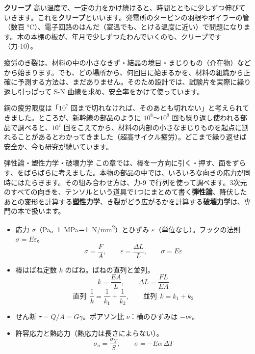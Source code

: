 \noindent\textbf{クリープ}\quad
高い温度で、一定の力をかけ続けると、時間とともに少しずつ伸びていきます。これを\textbf{クリープ}といいます。発電所のタービンの羽根やボイラーの管（数百 \unit{\celsius}）、電子回路のはんだ（室温でも、とける温度に近い）で問題になります。木の本棚の板が、年月で少しずつたわんでいくのも、クリープです（力-10）。

\begin{phmada}
疲労のき裂は、材料の中の小さなきず・結晶の境目・まじりもの（介在物）などから始まります。でも、どの場所から、何回目に始まるかを、材料の組織から正確に予測する方法は、まだありません。そのため設計では、試験片を実際に繰り返し引っぱって S-N 曲線を求め、安全率をかけて使っています。

鋼の疲労限度は「$10^7$ 回まで切れなければ、そのあとも切れない」と考えられてきました。ところが、新幹線の部品のように $10^8$〜$10^9$ 回も繰り返し使われる部品で調べると、$10^7$ 回をこえてから、材料の内部の小さなまじりものを起点に割れることがあるとわかってきました（超高サイクル疲労）。どこまで繰り返せば安全か、今も研究が続いています。
\end{phmada}

\begin{phsaki}{弾性論・塑性力学・破壊力学}
この章では、棒を一方向に引く・押す、面をずらす、をばらばらに考えました。本物の部品の中では、いろいろな向きの応力が同時にはたらきます。その組み合わせ方は、力-9 で行列を使って調べます。3次元のすべての向きを、テンソルという道具で1つにまとめて書く\textbf{弾性論}、降伏したあとの変形を計算する\textbf{塑性力学}、き裂がどう広がるかを計算する\textbf{破壊力学}は、専門の本で扱います。
\end{phsaki}

\begin{taisetsu}
\begin{itemize}[leftmargin=1.2\zw, itemsep=2pt, topsep=1pt, label={\color{bkTheme}●}]
\item 応力 $\sigma$（Pa。\qty{1}{MPa}＝\qty{1}{N/mm^2}）とひずみ $\varepsilon$（単位なし）。フックの法則 $\sigma=E\varepsilon$。
\[\sigma=\frac{F}{A},\qquad\varepsilon=\frac{\Delta L}{L},\qquad\sigma=E\varepsilon\]
\item 棒はばね定数 $k$ のばね。ばねの直列と並列。
\[k=\frac{EA}{L},\qquad\Delta L=\frac{FL}{EA}\]
\[\text{直列}\ \ \frac{1}{k}=\frac{1}{k_1}+\frac{1}{k_2},\qquad\text{並列}\ \ k=k_1+k_2\]
\item せん断 $\tau=Q/A=G\gamma$。ポアソン比 $\nu$：横のひずみは $-\nu\varepsilon$。
\item 許容応力と熱応力（熱応力は長さによらない）。
\[\sigma_a=\frac{\sigma_Y}{S},\qquad\sigma=-E\alpha\,\Delta T\]
\end{itemize}
\end{taisetsu}

